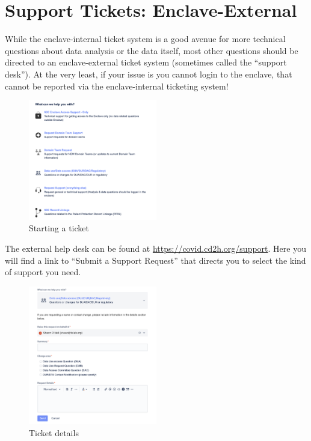 \documentclass[
  letterpaper,
  DIV=11,
  numbers=noendperiod]{scrreprt}
\begin{document}
\hypertarget{sec-support-external}{%
\section{Support Tickets: Enclave-External}\label{sec-support-external}}

While the enclave-internal ticket system is a good avenue for more
technical questions about data analysis or the data itself, most other
questions should be directed to an enclave-external ticket system
(sometimes called the ``support desk''). At the very least, if your
issue is you cannot login to the enclave, that cannot be reported via
the enclave-internal ticketing system!

\begin{figure}

{\centering \includegraphics[width=0.5\textwidth,height=\textheight]{chapters/images/support/image-09-ticket-start.png}

}

\caption{\label{fig-support-ticket-start}Starting a ticket}

\end{figure}

The external help desk can be found at
\url{https://covid.cd2h.org/support}. Here you will find a link to
``Submit a Support Request'' that directs you to select the kind of
support you need.

\begin{figure}

{\centering \includegraphics[width=0.5\textwidth,height=\textheight]{chapters/images/support/image-10-ticket-details.png}

}

\caption{\label{fig-support-ticket-details}Ticket details}

\end{figure}
\end{document}
